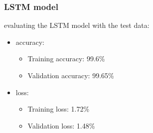 \subsubsection{LSTM model}


evaluating the LSTM model with the test data:
\firmlist
		\begin{itemize}
			\item accuracy:
				\begin{itemize}
					\item Training accuracy: 99.6\%
					\item Validation accuracy: 99.65\%
				\end{itemize}
			\item loss:
				\begin{itemize}
					\item Training loss: 1.72\%
					\item Validation loss: 1.48\%
				\end{itemize}
		\end{itemize}
		
		



